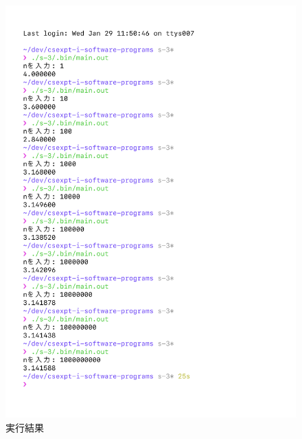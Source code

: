 \begin{figure}[H]
    \centering
    \includegraphics[width=0.8\hsize, pagebox=mediabox, page=1]{main_result_img.pdf}
    \caption{実行結果}
    \label{実行結果}
\end{figure}




